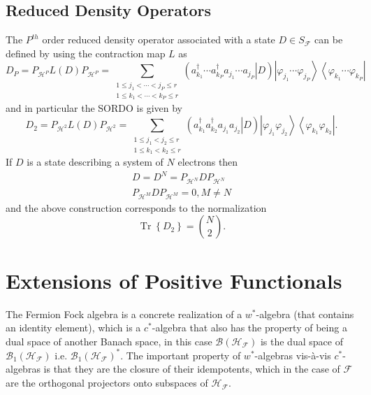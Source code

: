 \documentclass[aps,preprint]{revtex4}%
\begin{document}
\subsection{Reduced Density Operators \label{Reduced Density Operators}}

The $P^{th}$ order reduced density operator associated with a state $D\in
S_{\mathcal{F}}$ can be defined by using the contraction map $L$ as
\begin{equation}
D_{P}=P_{\mathcal{H}^{P}}L\left(  D\right)  P_{\mathcal{H}^{P}}=\sum
_{\substack{1\leq j_{1}<\cdots<j_{P}\leq r\\1\leq k_{1}<\cdots<k_{P}\leq
r}}\left(  \left.  a_{k_{1}}^{\dagger}\cdots a_{k_{P}}^{\dagger}a_{j_{1}%
}\cdots a_{j_{P}}\right\vert D\right)  \left\vert \varphi_{j_{1}}\cdots
\varphi_{j_{P}}\right\rangle \left\langle \varphi_{k_{1}}\cdots\varphi_{k_{P}%
}\right\vert \label{PORDO}%
\end{equation}
and in particular the SORDO is given by
\begin{equation}
D_{2}=P_{\mathcal{H}^{2}}L\left(  D\right)  P_{\mathcal{H}^{2}}=\sum
_{\substack{1\leq j_{1}<j_{2}\leq r\\1\leq k_{1}<k_{2}\leq r}}\left(  \left.
a_{k_{1}}^{\dagger}a_{k_{2}}^{\dagger}a_{j_{1}}a_{j_{2}}\right\vert D\right)
\left\vert \varphi_{j_{1}}\varphi_{j_{2}}\right\rangle \left\langle
\varphi_{k_{1}}\varphi_{k_{2}}\right\vert .
\end{equation}
If $D$ is a state describing a system of $N$ electrons then
\begin{gather}
D=D^{N}=P_{\mathcal{H}^{N}}DP_{\mathcal{H}^{N}}\nonumber\\
P_{\mathcal{H}^{M}}DP_{\mathcal{H}^{M}}=0,M\neq N
\end{gather}
and the above construction corresponds to the normalization
\begin{equation}
\operatorname*{Tr}\left\{  D_{2}\right\}  =\binom{N}{2}.
\end{equation}


\section{Extensions of Positive Functionals \label{Extensions}}

The Fermion Fock algebra is a concrete realization of a $w^{\ast}$-algebra
\cite{Encyclo} (that contains an identity element), which is a $c^{\ast}%
$-algebra that also has the property of being a dual space of another Banach
space, in this case $\mathcal{B}\left(  \mathcal{H}_{\mathcal{F}}\right)  $ is
the dual space of $\mathcal{B}_{1}\left(  \mathcal{H}_{\mathcal{F}}\right)  $
i.e. $\mathcal{B}_{1}\left(  \mathcal{H}_{\mathcal{F}}\right)  ^{\ast}$. The
important property of $w^{\ast}$-algebras vis-\`{a}-vis $c^{\ast}$-algebras is
that they are the closure of their idempotents, which in the case of
$\mathcal{F}$ are the orthogonal projectors onto subspaces of $\mathcal{H}%
_{\mathcal{F}}.$
\end{document}
